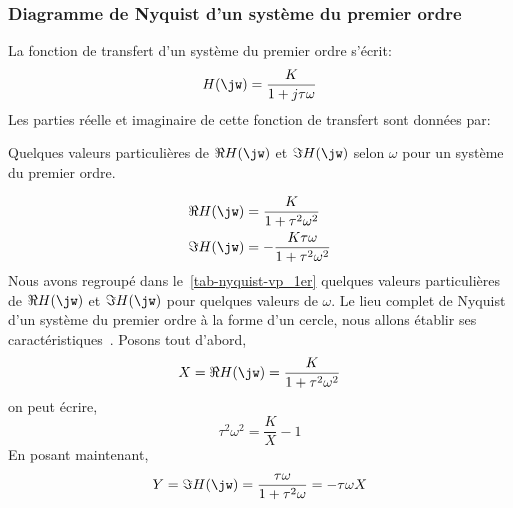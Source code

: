 \subsubsection{Diagramme de Nyquist d'un système du premier ordre}
La fonction de transfert d'un système du premier ordre s'écrit:
\[
H(\jw)=\dfrac{K}{1+j\tau\omega}
\]
Les parties réelle et imaginaire de cette fonction de transfert sont données 
par:
\begin{margintable}
    \centering
    \caption{Quelques valeurs particulières de $\Re{H(\jw)}$ et $\Im{H(\jw)}$
    selon $\omega$ pour un système du premier ordre\label{tab-nyquist-vp_1er}.}
\end{margintable}
\begin{align*}
    \Re{H(\jw)}&=\dfrac{K}{1+\tau^2\omega^2}\\
    \Im{H(\jw)}&=-\dfrac{K\tau\omega}{1+\tau^2\omega^2}\\
\end{align*}
Nous avons regroupé dans le~\cref{tab-nyquist-vp_1er} quelques valeurs 
particulières de $\Re{H(\jw)}$ et $\Im{H(\jw)}$ pour quelques valeurs 
de $\omega$.
\newpage
\restoregeometry
\captionsetup{width=\linewidth}
Le lieu complet de Nyquist d'un système du premier ordre à la forme d'un 
cercle, nous allons établir ses caractéristiques~\cite{9782729860127}.
Posons tout d'abord, 
\[
X=\Re{H(\jw)}=\dfrac{K}{1+\tau^2\omega^2}
\]
on peut écrire,
\[
\tau^2\omega^2=\dfrac{K}{X}-1
\]
En posant maintenant, 
\[
Y=\Im{H(\jw)}=\dfrac{\tau\omega}{1+\tau^2\omega}=-\tau\omega X
\]
